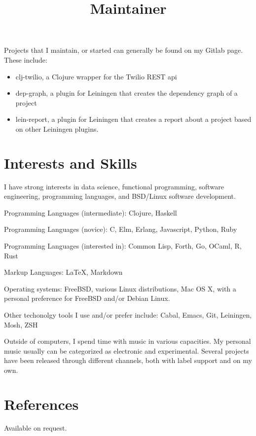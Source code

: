 \documentclass[margintitle,line]{res}
\begin{document}
\begin{resume}
\title{Maintainer}
\begin{position}
Projects that I maintain, or started can generally be found on my
Gitlab page. These include:
\begin{itemize}
\item{clj-twilio, a Clojure wrapper for the Twilio REST api}
\item{dep-graph, a plugin for Leiningen that creates the dependency
    graph of a project}
\item{lein-report, a plugin for Leiningen that creates a report about
    a project based on other Leiningen plugins.}
\end{itemize}
\end{position}


\section{Interests and Skills}

I have strong interests in data science, functional programming,
software engineering, programming languages, and BSD/Linux software development.

Programming Languages (intermediate): Clojure, Haskell

Programming Languages (novice): C, Elm, Erlang, Javascript, Python, Ruby

Programming Languages (interested in): Common Lisp, Forth, Go, OCaml,
R, Rust

Markup Languages: LaTeX, Markdown

Operating systems: FreeBSD, various Linux distributions, Mac OS X, with a personal
preference for FreeBSD and/or Debian Linux.

Other techonolgy tools I use and/or prefer include: Cabal, Emacs, Git, Leiningen, Mosh, ZSH

Outside of computers, I spend time with music in various
capacities. My personal music usually can be categorized as electronic
and experimental. Several projects have been released through
different channels, both with label support and on my own.

\section{References}

Available on request.

\end{resume}
\end{document}
